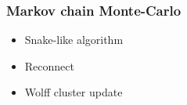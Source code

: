 \documentclass{beamer}
\begin{document}
\begin{frame} 
	\frametitle{Markov chain Monte-Carlo}
	\begin{minipage}{0.44\linewidth}
		\begin{itemize} 
			
			\item  Snake-like algorithm 
			
			 \bigbreak  
			 \bigbreak  
			 \bigbreak  
			 \bigbreak  
			
			\item Reconnect
			
			\bigbreak  
			\bigbreak  
			\bigbreak  
			\bigbreak  
			 
			\item Wolff cluster update 
			\bigbreak  
			\bigbreak  
			\bigbreak  
			
		\end{itemize} 
		

\end{minipage}
\end{frame}
\end{document}
